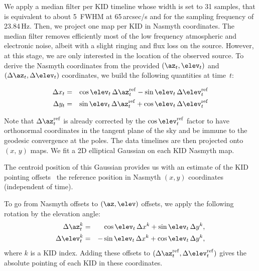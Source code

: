 We apply a median filter per KID timeline whose width is set to 31
samples, that is equivalent to about 5~FWHM at 65\,arcsec/s and for the
sampling frequency of
23.84\,Hz. Then, we project one map per KID in Nasmyth
coordinates. The median filter removes
efficiently most of the low frequency atmospheric and electronic
noise, albeit with a slight ringing and flux loss on the
source. However, at this stage, we are only interested in the location
of the observed source.
To derive the Nasmyth coordinates from the
provided $(\az_t,\elev_t)$ and $(\Delta\az_t,\Delta\elev_t)$
coordinates, we build the following quantities at time~$t$:

\begin{eqnarray}
\Delta x_t &=& \cos\elev_t \, \Delta\az_t^{\rm{ref}} - \sin \elev_t \, \Delta \elev_t^{\rm{ref}} \nonumber \\
\Delta y_t &=& \sin\elev_t \, \Delta\az_t^{\rm{ref}} + \cos \elev_t \, \Delta \elev_t^{\rm{ref}} \nonumber
\end{eqnarray}

Note that $\Delta\az_t^{\rm{ref}}$ is already corrected by the $\cos\elev_t^{\rm{ref}}$ factor to
have orthonormal coordinates in the tangent plane of the sky and be immune to
the geodesic convergence at the poles.
The data timelines are then projected onto $(x,\, y)$ maps. 
We fit a 2D elliptical Gaussian on each KID Nasmyth map. {\lp The centroid
position of this Gaussian provides us with an estimate of the KID
pointing offsets \wrt\ the reference position in Nasmyth
$(x,y)$ coordinates (independent of time).

To go from Nasmyth offsets to $(\az,\elev)$ offsets, we apply the
following rotation by the elevation angle:
\begin{eqnarray}
\Delta\az^k_t &=&  \cos\elev_t \, \Delta x^k + \sin\elev_t \, \Delta y^k, \nonumber\\
\Delta\elev^k_t &=& -\sin\elev_t \, \Delta x^k + \cos\elev_t \, \Delta y^k, \nonumber
\end{eqnarray}
where $k$ is a KID index. Adding these offsets to
$(\Delta \az_t^{\rm{ref}}, \Delta \elev_t^{\rm{ref}})$ gives the
absolute pointing of each KID in these coordinates.}

